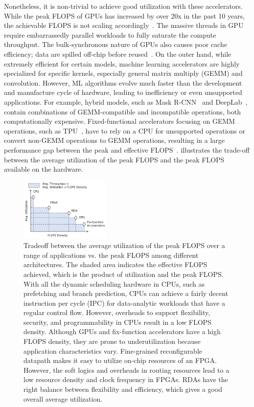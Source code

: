 Nonetheless, it is non-trivial to achieve good utilization with these accelerators.
While the peak FLOPS of GPUs has increased by over 20x in the past 10 years, the achievable FLOPS is
not scaling accordingly~\cite{floptrend, gpuperfana}.
The massive threads in GPU require embarrassedly parallel workloads to fully saturate the compute
throughput. The bulk-synchronous nature of GPUs also causes poor cache efficiency; data are spilled
off-chip before reused~\cite{gpuinefficiency}.
On the outer hand,
while extremely efficient for certain models, machine learning accelerators are highly
specialized for specific kernels, especially general matrix multiply (GEMM) and convolution.
However, ML algorithms evolve much faster than the development and manufacture cycle of hardware,
leading to inefficiency or even unsupported applications.
For example, hybrid models, such as Mask R-CNN~\cite{maskrcnn} and DeepLab~\cite{deeplab}, contain
combinations of GEMM-compatible and incompatible operations, both computationally expensive.
Fixed-functional accelerators focusing on GEMM operations, such as TPU~\cite{tpu},
have to rely on a CPU for unsupported operations or
convert non-GEMM operations to GEMM operations, resulting in a large performance gap between the
peak and effective FLOPS~\cite{effflexdnnaccel}.
 illustrates the trade-off between the average utilization of the peak FLOPS
and the peak FLOPS available on the hardware.

\begin{figure}
\centering
\includegraphics[width=0.4\textwidth]{figs/peakutil.pdf}
\caption[Average utilization vs. peak compute density trade-off]{
 Tradeoff between the average utilization of the peak FLOPS over a range of applications vs. the
  peak FLOPS among different architectures.
 The shaded area indicates the effective FLOPS achieved, which is the product of utilization and
  the peak FLOPS.
 With all the dynamic scheduling hardware in CPUs, such as prefetching and branch prediction,
 CPUs can achieve a fairly decent instruction per cycle (IPC) for data-analytic workloads that have a
 regular control flow.
 However, overheads to support flexibility, security, and programmability in CPUs result in a low FLOPS
 density.
 Although GPUs and fix-function accelerators have a high FLOPS density, they are prone to
 underutilization because application characteristics vary.
 Fine-grained reconfigurable datapath makes it easy to utilize on-chip resources of an FPGA.
 However, the soft logics and overheads in routing resources lead to a low resource density and
  clock frequency in FPGAs.
 RDAs have the right balance between flexibility and efficiency, which gives a good overall average utilization.
}
\label{fig:peakutil}
\end{figure}

